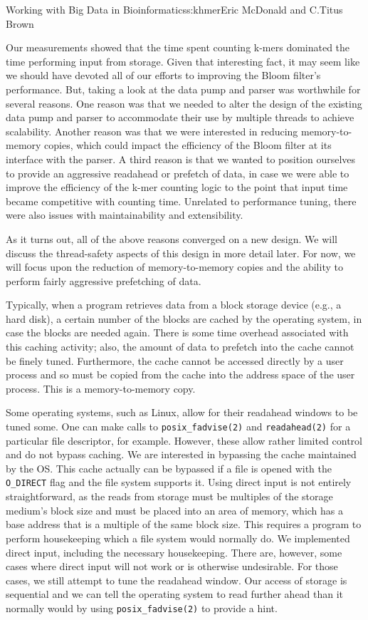 \begin{aosachapter}{Working with Big Data in Bioinformatics}{s:khmer}{Eric McDonald and C.\/Titus Brown}

Our measurements showed that the time spent counting k-mers dominated
the time performing input from storage. Given that interesting fact, it
may seem like we should have devoted all of our efforts to improving the
Bloom filter's performance. But, taking a look at the data pump and
parser was worthwhile for several reasons. One reason was that we needed
to alter the design of the existing data pump and parser to accommodate
their use by multiple threads to achieve scalability. Another reason was
that we were interested in reducing memory-to-memory copies, which could
impact the efficiency of the Bloom filter at its interface with the
parser. A third reason is that we wanted to position ourselves to
provide an aggressive readahead or prefetch of data, in case we were
able to improve the efficiency of the k-mer counting logic to the point
that input time became competitive with counting time. Unrelated to
performance tuning, there were also issues with maintainability and
extensibility.

As it turns out, all of the above reasons converged on a new design. We
will discuss the thread-safety aspects of this design in more detail
later. For now, we will focus upon the reduction of memory-to-memory
copies and the ability to perform fairly aggressive prefetching of data.

Typically, when a program retrieves data from a block storage device
(e.g., a hard disk), a certain number of the blocks are cached by the
operating system, in case the blocks are needed again. There is some
time overhead associated with this caching activity; also, the amount of
data to prefetch into the cache cannot be finely tuned. Furthermore, the
cache cannot be accessed directly by a user process and so must be
copied from the cache into the address space of the user process. This
is a memory-to-memory copy.

Some operating systems, such as Linux, allow for their readahead windows
to be tuned some. One can make calls to \texttt{posix\_fadvise(2)} and
\texttt{readahead(2)} for a particular file descriptor, for example.
However, these allow rather limited control and do not bypass caching.
We are interested in bypassing the cache maintained by the OS. This
cache actually can be bypassed if a file is opened with the
\texttt{O\_DIRECT} flag and the file system supports it. Using direct
input is not entirely straightforward, as the reads from storage must be
multiples of the storage medium's block size and must be placed into an
area of memory, which has a base address that is a multiple of the same
block size. This requires a program to perform housekeeping which a file
system would normally do. We implemented direct input, including the
necessary housekeeping. There are, however, some cases where direct
input will not work or is otherwise undesirable. For those cases, we
still attempt to tune the readahead window. Our access of storage is
sequential and we can tell the operating system to read further ahead
than it normally would by using \texttt{posix\_fadvise(2)} to provide a
hint.


\end{aosachapter}
